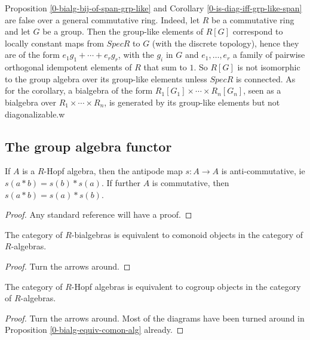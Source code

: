 Proposition \ref{0-bialg-bij-of-span-grp-like} and Corollary \ref{0-is-diag-iff-grp-like-span} are false over a general commutative ring.
Indeed, let $R$ be a commutative ring and let $G$ be a group.
Then the group-like elements of $R[G]$ correspond to locally constant maps from $Spec R$ to $G$ (with the discrete topology),
hence they are of the form $e_1 g_1+\cdots+e_r g_r$, with the $g_i$ in $G$ and $e_1,\ldots,e_r$ a family of pairwise orthogonal idempotent elements of $R$ that sum to $1$.
So $R[G]$ is not isomorphic to the group algebra over its group-like elements unless $Spec R$ is connected.
As for the corollary, a bialgebra of the form $R_1[G_1]\times\cdots\times R_n[G_n]$,
seen as a bialgebra over $R_1\times\cdots\times R_n$,
is generated by its group-like elements but not diagonalizable.w


\subsection{The group algebra functor}


\begin{proposition}
  \label{0-antipode-mul}
  \uses{}
  \leanok

  If $A$ is a $R$-Hopf algebra, then the antipode map $s : A \to A$ is anti-commutative, ie $s(a * b) = s(b) * s(a)$. If further $A$ is commutative, then $s(a * b) = s(a) * s(b)$.
\end{proposition}
\begin{proof}
  \uses{}
  \leanok

  Any standard reference will have a proof.
\end{proof}


\begin{proposition}
  \label{0-bialg-equiv-comon-alg}
  \uses{}
  \leanok

  The category of $R$-bialgebras is equivalent to comonoid objects in the category of $R$-algebras.
\end{proposition}
\begin{proof}
  \uses{}
  \leanok

  Turn the arrows around.
\end{proof}


\begin{proposition}
  \label{0-hopf-alg-equiv-cogrp-alg}
  \uses{}
  \leanok

  The category of $R$-Hopf algebras is equivalent to cogroup objects in the category of $R$-algebras.
\end{proposition}
\begin{proof}
  \leanok

  Turn the arrows around.
  Most of the diagrams have been turned around in Proposition \ref{0-bialg-equiv-comon-alg} already.
\end{proof}


